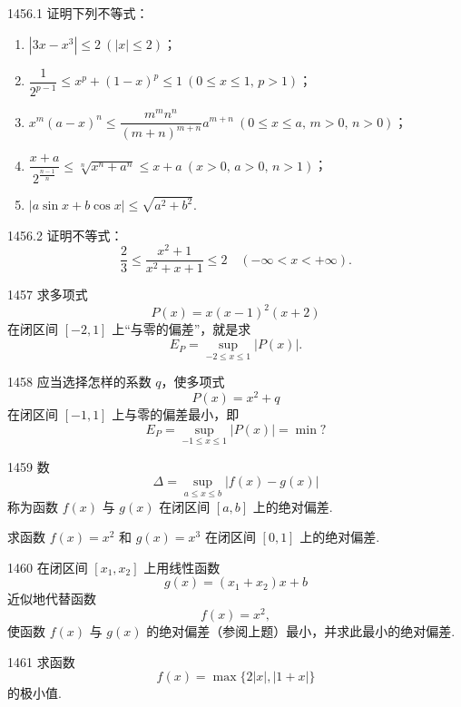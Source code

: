 \begin{prob}[L]{1456.1}
证明下列不等式：
\begin{enumerate}[label=(\alph*), itemsep=2pt, topsep=3pt]
    \item $|3x - x^3| \leqslant 2 \ (|x| \leqslant 2)$；
    \item $\dfrac{1}{2^{p - 1}} \leqslant x^p + (1 - x)^p \leqslant 1 \ (0 \leqslant x \leqslant 1, \, p > 1)$；
    \item $x^m (a - x)^n \leqslant \dfrac{m^m n^n}{(m + n)^{m + n}} a^{m + n} \ (0 \leqslant x \leqslant a, \, m > 0, \, n > 0)$；
    \item $\dfrac{x + a}{2^{\frac{n - 1}{n}}} \leqslant \sqrt[n]{x^n + a^n} \leqslant x + a \ (x > 0, \, a > 0, \, n > 1)$；
    \item $|a\sin x + b\cos x| \leqslant \sqrt{a^2 + b^2}$.
\end{enumerate}
\end{prob}

\begin{prob}[M]{1456.2}
证明不等式：
\[
\frac{2}{3} \leqslant \frac{x^2 + 1}{x^2 + x + 1} \leqslant 2 \quad (-\infty < x < +\infty).
\]
\end{prob}

\begin{prob}[M]{1457}
求多项式
\[
P(x) = x(x - 1)^2 (x + 2)
\]
在闭区间 $[-2, 1]$ 上``与零的偏差''，就是求
\[
E_P = \sup_{-2 \leqslant x \leqslant 1} |P(x)|.
\]
\end{prob}

\begin{prob}[M]{1458}
应当选择怎样的系数 $q$，使多项式
\[
P(x) = x^2 + q
\]
在闭区间 $[-1, 1]$ 上与零的偏差最小，即
\[
E_P = \sup_{-1 \leqslant x \leqslant 1} |P(x)| = \min ?
\]
\end{prob}

\begin{prob}[M]{1459}
数
\[
\Delta = \sup_{a \leqslant x \leqslant b} |f(x) - g(x)|
\]
称为函数 $f(x)$ 与 $g(x)$ 在闭区间 $[a, b]$ 上的绝对偏差.

求函数 $f(x) = x^2$ 和 $g(x) = x^3$ 在闭区间 $[0, 1]$ 上的绝对偏差.
\end{prob}

\begin{prob}[M]{1460}
在闭区间 $[x_1, x_2]$ 上用线性函数
\[
g(x) = (x_1 + x_2)x + b
\]
近似地代替函数
\[
f(x) = x^2,
\]
使函数 $f(x)$ 与 $g(x)$ 的绝对偏差（参阅上题）最小，并求此最小的绝对偏差.
\end{prob}

\begin{prob}[M]{1461}
求函数
\[
f(x) = \max\{2|x|, |1+x|\}
\]
的极小值.
\end{prob}

